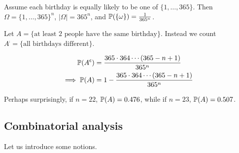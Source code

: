 \documentclass{../template/note}
\begin{document}
\begin{example}
\begin{itemize}
            Assume each birthday is equally likely to be one of \(\{1, \dots, 365\}\). Then \(\Omega = \{1, \dots, 365\}^n\), \(| \Omega|  = 365^n\), and \(\mathbb P(\{\omega\}) = \frac{1}{365^n}\).

            Let \(A = \{\text{at least 2 people have the same birthday}\}\). Instead we count \(A^\comp = \{\text{all birthdays different}\}\).

            \begin{align*}
                \mathbb P(A^{\mathsf{c}}) &= \frac{365 \cdot 364 \cdots (365-n+1)}{365^n} \\
                \implies \mathbb P(A) &= 1 - \frac{365 \cdot 364 \cdots (365-n+1)}{365^n}
            \end{align*}
            
            Perhaps surprisingly, if \(n=22\), \(\mathbb P(A) = 0.476\), while if \(n=23\), \(\mathbb P(A) = 0.507\).
        \end{itemize}
    \end{example}
    
    \subsection{Combinatorial analysis}

    Let us introduce some notions.
\end{document}
